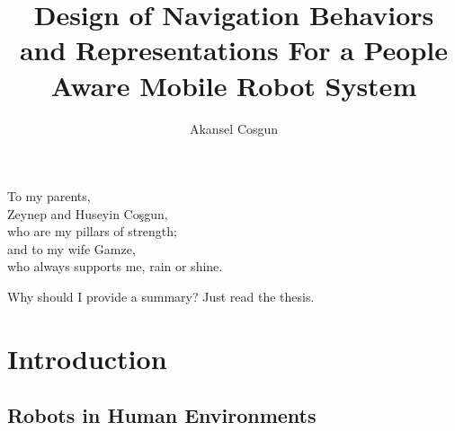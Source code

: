 \documentclass[12pt]{gatech-thesis}
\title{Design of Navigation Behaviors and Representations For a People Aware Mobile Robot System}
\author{Akansel Cosgun}
\begin{document}
%

\begin{preliminary}

\begin{dedication}
\null\vfil
{\large
\begin{center}
To my parents,\\\vspace{12pt}
Zeynep and Huseyin Co\c{s}gun,\\\vspace{12pt}
who are my pillars of strength;\\\vspace{12pt}
and to my wife Gamze,\\\vspace{12pt}
who always supports me, rain or shine.\\\vspace{12pt}
\end{center}}
\vfil\null
\end{dedication}






\contents
\begin{summary}
Why should I provide a summary?  Just read the thesis.
\end{summary}
\end{preliminary}

%

\chapter{Introduction}
\label{chapter:introduction}


\section{Robots in Human Environments}
\end{document}
